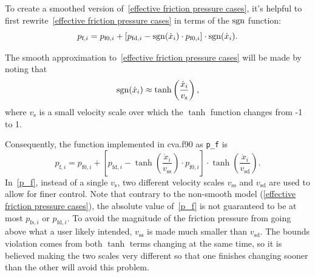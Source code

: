 To create a smoothed version of~\eqref{effective friction pressure cases}, it's helpful to first rewrite~\eqref{effective friction pressure cases} in terms of the $\operatorname{sgn}$ function:
\begin{equation}
    p_{\text{f},i} =
    p_{\text{f0},i}
    + [p_{\text{fd},i} - \operatorname{sgn}(\dot{x}_i) \cdot p_{\text{f0},i}] \cdot \operatorname{sgn}(\dot{x}_i).
\end{equation}

The smooth approximation to~\eqref{effective friction pressure cases} will be made by noting that
\begin{equation}
    \operatorname{sgn}(\dot{x}_i) \approx \tanh\left(\frac{\dot{x}_i}{v_\text{s}}\right),
\end{equation}
where $v_\text{s}$ is a small velocity scale over which the $\tanh$ function changes from -1 to 1.

Consequently, the function implemented in cva.f90 as \texttt{p\_f} is
\begin{equation}
    p_{\text{f},i} =
    p_{\text{f0},i}
    + \left[p_{\text{fd},i} - \tanh\left(\frac{\dot{x}_i}{v_\text{ss}}\right) \cdot p_{\text{f0},i}\right] \cdot \tanh\left(\frac{\dot{x}_i}{v_\text{sd}}\right). \label{eq:p_f}
\end{equation}
In~\eqref{p_f}, instead of a single $v_\text{s}$, two different velocity scales $v_\text{ss}$ and $v_\text{sd}$ are used to allow for finer control.
Note that contrary to the non-smooth model (\eqref{effective friction pressure cases}), the absolute value of~\eqref{p_f} is not guaranteed to be at most $p_{\text{fs},i}$ or $p_{\text{fd},i}$.
To avoid the magnitude of the friction pressure from going above what a user likely intended, $v_\text{ss}$ is made much smaller than $v_\text{sd}$.
The bounds violation comes from both $\tanh$ terms changing at the same time, so it is believed making the two scales very different so that one finishes changing sooner than the other will avoid this problem.


